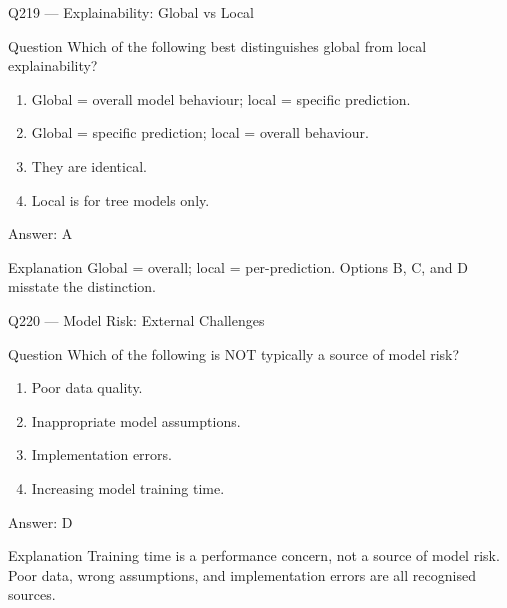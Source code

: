 \documentclass[aspectratio=169,8pt]{beamer}
\begin{document}
\begin{frame}{Q219 --- Explainability: Global vs Local}
\begin{block}{Question}
Which of the following best distinguishes global from local explainability?
\begin{enumerate}
	\item Global = overall model behaviour; local = specific prediction.
	\item Global = specific prediction; local = overall behaviour.
	\item They are identical.
	\item Local is for tree models only.
\end{enumerate}  \end{block}
\begin{exampleblock}{Answer: A}\end{exampleblock}
\begin{block}{Explanation}
	Global = overall; local = per-prediction. Options B, C, and D misstate the distinction.
\end{block}
\end{frame}

\begin{frame}{Q220 --- Model Risk: External Challenges}
\begin{block}{Question}
	Which of the following is NOT typically a source of model risk?
	\begin{enumerate}
		\item Poor data quality.
		\item Inappropriate model assumptions.
		\item Implementation errors.
		\item Increasing model training time.
	\end{enumerate}  \end{block}
	\begin{exampleblock}{Answer: D}\end{exampleblock}
	\begin{block}{Explanation}
		Training time is a performance concern, not a source of model risk. Poor data, wrong assumptions, and implementation errors are all recognised sources.
	\end{block}
\end{frame}
\end{document}
